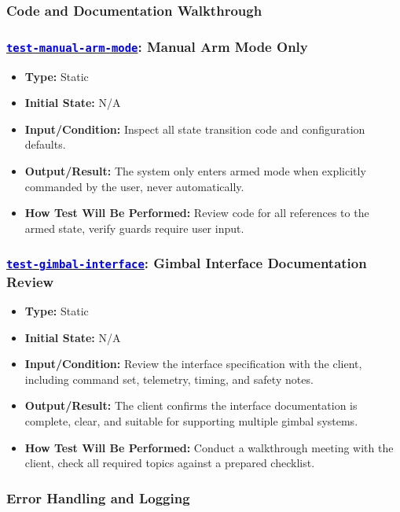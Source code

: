 \documentclass[12pt, titlepage]{article}
\newcommand{\tid}[1]{\hyperlink{tid:#1}{\textcolor{blue}{\texttt{#1}}}}
\begin{document}
\subsubsection{Code and Documentation Walkthrough}

\subsubsection*{\tid{test-manual-arm-mode}: Manual Arm Mode Only}
\begin{itemize}
  \item \textbf{Type:} Static
  \item \textbf{Initial State:} N/A
  \item \textbf{Input/Condition:} Inspect all state transition code and configuration defaults.
  \item \textbf{Output/Result:} The system only enters armed mode when explicitly commanded by the user, never automatically.
  \item \textbf{How Test Will Be Performed:} Review code for all references to the armed state, verify guards require user input.
\end{itemize}

\subsubsection*{\tid{test-gimbal-interface}: Gimbal Interface Documentation Review}
\begin{itemize}
  \item \textbf{Type:} Static
  \item \textbf{Initial State:} N/A
  \item \textbf{Input/Condition:} Review the interface specification with the client, including command set, telemetry, timing, and safety notes.
  \item \textbf{Output/Result:} The client confirms the interface documentation is complete, clear, and suitable for supporting multiple gimbal systems.
  \item \textbf{How Test Will Be Performed:} Conduct a walkthrough meeting with the client, check all required topics against a prepared checklist.
\end{itemize}

\subsubsection{Error Handling and Logging}
\end{document}
